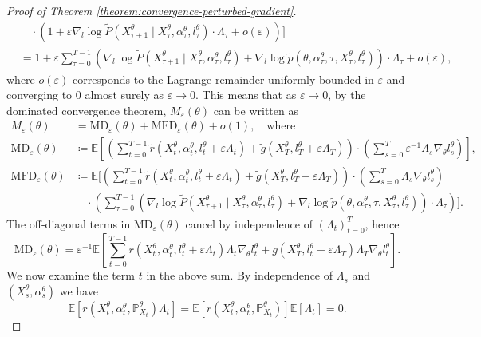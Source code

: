 \documentclass[11pt]{article}
\numberwithin{equation}{section}
\theoremstyle{definition}
\theoremstyle{remark}
\def\eps{\varepsilon}
\begin{document}
\begin{proof}[Proof of Theorem \ref{theorem:convergence-perturbed-gradient}]
\[\begin{aligned}
&\quad \cdot \left(1 + \eps \nabla_{l} \log \tilde P(X_{\tau + 1}^\theta \mid  X_\tau^{\theta},\alpha_\tau^\theta, l_\tau^\theta) \cdot \Lambda_\tau + o(\eps)\right) \Big] \\
&= 1 + \eps \sum_{\tau = 0}^{T - 1} \left(\nabla_{l} \log \tilde P(X_{\tau + 1}^\theta \mid  X_\tau^{\theta},\alpha_\tau^\theta, l_\tau^\theta) + \nabla_{l} \log \tilde p(\theta, \alpha_\tau^\theta,\tau,X_\tau^{\theta}, l_\tau^\theta) \right) \cdot \Lambda_\tau    + o (\eps),
\end{aligned}
\]
where $o(\eps)$ corresponds to the Lagrange remainder uniformly bounded in $\eps$ and converging to $0$ almost surely as $\eps \to 0$.
This means that as $\eps \to 0$, by the dominated convergence theorem, $M_\eps(\theta)$ can be written as
\[
\begin{aligned}
M_{\eps}(\theta) &= \mathrm{MD}_{\eps}(\theta) + \mathrm{MFD}_{\eps}(\theta) + o(1), \quad \text{where} \\
\mathrm{MD}_{\eps}(\theta) & \coloneq \mathbb E \left[\left( \sum_{t = 0}^{T - 1} \tilde r(X_t^\theta,  \alpha_t^{\theta},  l_t^\theta + \eps \Lambda_t) + 
\tilde g(X_T^{\theta}, l^{\theta}_T + \eps \Lambda_T) \right) \cdot \left( \sum_{s = 0}^{T} \eps^{-1} \Lambda_{s} \nabla_{\theta} l_s^{\theta}  \right)\right],\\
\mathrm{MFD}_{\eps}(\theta) &\coloneq \mathbb E \Bigg[\left( \sum_{t = 0}^{T - 1} \tilde r(X_t^\theta,  \alpha_t^{\theta},  l_t^\theta + \eps \Lambda_t) + 
\tilde g(X_T^{\theta}, l^{\theta}_T + \eps \Lambda_T) \right) \cdot \left( \sum_{s = 0}^{T} \Lambda_s \nabla_{\theta} l_s^\theta   \right) \\
& \quad \cdot \left( \sum_{\tau = 0}^{T - 1} \left(\nabla_{l} \log \tilde P(X_{\tau + 1}^\theta \mid  X_\tau^{\theta},\alpha_\tau^\theta, l_\tau^\theta) + \nabla_l \log \tilde p(\theta, \alpha_\tau^\theta,\tau,X_\tau^{\theta}, l_\tau^\theta) \right) \cdot \Lambda_{\tau} \right) \Bigg].
\end{aligned}
\]
The off-diagonal terms in $\mathrm{MD}_{\eps}(\theta)$ cancel by independence of $(\Lambda_t)_{t = 0}^{T}$, hence
\[
    \mathrm{MD}_{\eps}(\theta) = 
    \eps^{-1}\mathbb E \left[ \sum_{t = 0}^{T - 1} r(X_t^\theta, \alpha_t^\theta,l_t^\theta + \eps \Lambda_t) \Lambda_t \nabla_{\theta}l_t^\theta  + g(X_{T}^\theta, l_t^\theta + \eps \Lambda_T) \Lambda_T \nabla_{\theta}l_t^\theta  \right].
\]
We now examine the term $t$ in the above sum.
By independence of $\Lambda_s$ and $(X_s^\theta, \alpha_s^\theta)$ we have
\[
\mathbb E [r(X_t^\theta, \alpha_t^\theta,\mathbb P_{X_t}^\theta) \Lambda_t] = \mathbb E[r(X_t^\theta, \alpha_t^\theta,\mathbb P_{X_t}^\theta)] \mathbb E[\Lambda_t]=0.
\]
\end{proof}
\end{document}
